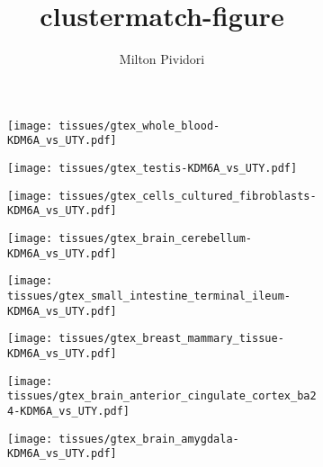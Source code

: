 \documentclass{memoir}
\title{clustermatch-figure}
\author{Milton Pividori}
\begin{document}
    \pagecolor{white}

\begin{figure}
     \centering
     \begin{subfigure}[b]{0.3\textwidth}
         \centering
         \texttt{[image: tissues/gtex\_whole\_blood-KDM6A\_vs\_UTY.pdf]}
     \end{subfigure}
     \hfill
     \begin{subfigure}[b]{0.3\textwidth}
         \centering
         \texttt{[image: tissues/gtex\_testis-KDM6A\_vs\_UTY.pdf]}
     \end{subfigure}
     \hfill
     \begin{subfigure}[b]{0.3\textwidth}
         \centering
         \texttt{[image: tissues/gtex\_cells\_cultured\_fibroblasts-KDM6A\_vs\_UTY.pdf]}
     \end{subfigure}
     \hfill
     \begin{subfigure}[b]{0.3\textwidth}
         \centering
         \texttt{[image: tissues/gtex\_brain\_cerebellum-KDM6A\_vs\_UTY.pdf]}
     \end{subfigure}
     \hfill
     \begin{subfigure}[b]{0.3\textwidth}
         \centering
         \texttt{[image: tissues/gtex\_small\_intestine\_terminal\_ileum-KDM6A\_vs\_UTY.pdf]}
     \end{subfigure}
     \hfill
     \begin{subfigure}[b]{0.3\textwidth}
         \centering
         \texttt{[image: tissues/gtex\_breast\_mammary\_tissue-KDM6A\_vs\_UTY.pdf]}
     \end{subfigure}
     \hfill
     \begin{subfigure}[b]{0.3\textwidth}
         \centering
         \texttt{[image: tissues/gtex\_brain\_anterior\_cingulate\_cortex\_ba24-KDM6A\_vs\_UTY.pdf]}
     \end{subfigure}
     \hfill
     \begin{subfigure}[b]{0.3\textwidth}
         \centering
         \texttt{[image: tissues/gtex\_brain\_amygdala-KDM6A\_vs\_UTY.pdf]}
     \end{subfigure}
     \hfill
     \begin{subfigure}[b]{0.3\textwidth}

\end{subfigure}
\end{figure}
\end{document}
